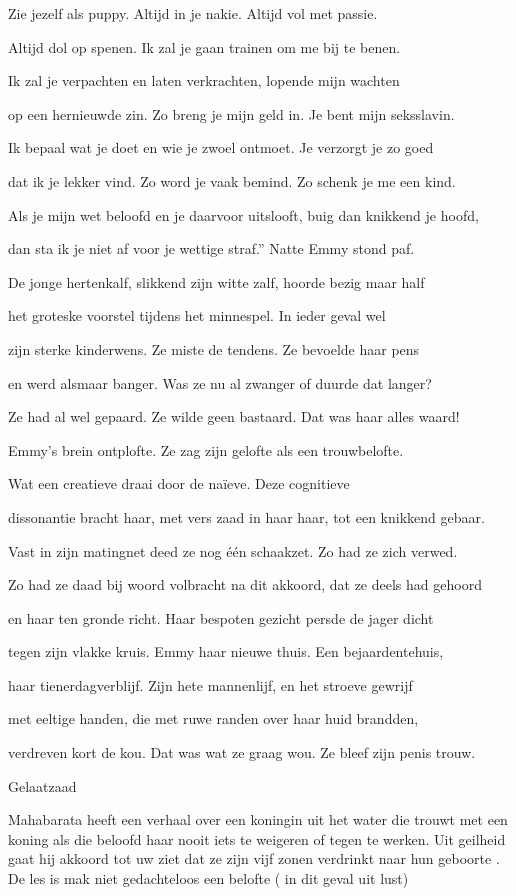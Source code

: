 Zie jezelf als puppy.
Altijd in je nakie.
Altijd vol met passie.

Altijd dol op spenen.
Ik zal je gaan trainen
om me bij te benen.

Ik zal je verpachten
en laten verkrachten,
lopende mijn wachten

op een hernieuwde zin.
Zo breng je mijn geld in.
Je bent mijn seksslavin.

Ik bepaal wat je doet
en wie je zwoel ontmoet.
Je verzorgt je zo goed

dat ik je lekker vind.
Zo word je vaak bemind.
Zo schenk je me een kind.

Als je mijn wet beloofd
en je daarvoor uitslooft,
buig dan knikkend je hoofd,

dan sta ik je niet af
voor je wettige straf.”
Natte Emmy stond paf.

De jonge hertenkalf,
slikkend zijn witte zalf,
hoorde bezig maar half

het groteske voorstel
tijdens het minnespel.
In ieder geval wel

zijn sterke kinderwens.
Ze miste de tendens.
Ze bevoelde haar pens

en werd alsmaar banger.
Was ze nu al zwanger
of duurde dat langer?

Ze had al wel gepaard.
Ze wilde geen bastaard.
Dat was haar alles waard!

Emmy’s brein ontplofte.
Ze zag zijn gelofte
als een trouwbelofte.

Wat een creatieve
draai door de naïeve.
Deze cognitieve

dissonantie bracht haar,
met vers zaad in haar haar,
tot een knikkend gebaar.

Vast in zijn matingnet
deed ze nog één schaakzet.
Zo had ze zich verwed.

Zo had ze daad bij woord
volbracht na dit akkoord,
dat ze deels had gehoord

en haar ten gronde richt.
Haar bespoten gezicht
persde de jager dicht

tegen zijn vlakke kruis.
Emmy haar nieuwe thuis.
Een bejaardentehuis,

haar tienerdagverblijf.
Zijn hete mannenlijf,
en het stroeve gewrijf

met eeltige handen,
die met ruwe randen
over haar huid brandden,

verdreven kort de kou.
Dat was wat ze graag wou.
Ze bleef zijn penis trouw.

Gelaatzaad

Mahabarata heeft een verhaal over een koningin uit het water die trouwt met een koning als die beloofd haar nooit iets te weigeren of tegen te werken. Uit geilheid gaat hij akkoord tot uw ziet dat ze zijn vijf zonen verdrinkt naar hun geboorte . De les is mak niet gedachteloos een belofte ( in dit geval uit lust)

